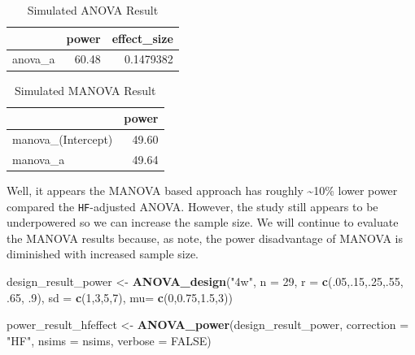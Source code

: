 \documentclass[
]{book}
\newenvironment{Shaded}{\begin{snugshade}}{\end{snugshade}}
\newcommand{\DataTypeTok}[1]{\textcolor[rgb]{0.13,0.29,0.53}{#1}}
\newcommand{\DecValTok}[1]{\textcolor[rgb]{0.00,0.00,0.81}{#1}}
\newcommand{\FloatTok}[1]{\textcolor[rgb]{0.00,0.00,0.81}{#1}}
\newcommand{\KeywordTok}[1]{\textcolor[rgb]{0.13,0.29,0.53}{\textbf{#1}}}
\newcommand{\NormalTok}[1]{#1}
\newcommand{\OtherTok}[1]{\textcolor[rgb]{0.56,0.35,0.01}{#1}}
\newcommand{\StringTok}[1]{\textcolor[rgb]{0.31,0.60,0.02}{#1}}
\begin{document}
\begin{table}[!h]

\caption{\label{tab:unnamed-chunk-141}Simulated ANOVA Result}
\centering
\begin{tabular}[t]{l|r|r}
\hline
  & power & effect\_size\\
\hline
anova\_a & 60.48 & 0.1479382\\
\hline
\end{tabular}
\end{table}
\begin{table}[!h]

\caption{\label{tab:unnamed-chunk-142}Simulated MANOVA Result}
\centering
\begin{tabular}[t]{l|r}
\hline
  & power\\
\hline
manova\_(Intercept) & 49.60\\
\hline
manova\_a & 49.64\\
\hline
\end{tabular}
\end{table}

\newpage

Well, it appears the MANOVA based approach has roughly \textasciitilde{}10\% lower power compared the \texttt{HF}-adjusted ANOVA. However, the study still appears to be underpowered so we can increase the sample size. We will continue to evaluate the MANOVA results because, as \citet{algina1997detecting} note, the power disadvantage of MANOVA is diminished with increased sample size.

\begin{Shaded}
\begin{Highlighting}[]
\NormalTok{design_result_power <-}\StringTok{ }\KeywordTok{ANOVA_design}\NormalTok{(}\StringTok{"4w"}\NormalTok{,}
                              \DataTypeTok{n =} \DecValTok{29}\NormalTok{,}
                              \DataTypeTok{r =} \KeywordTok{c}\NormalTok{(.}\DecValTok{05}\NormalTok{,.}\DecValTok{15}\NormalTok{,.}\DecValTok{25}\NormalTok{,.}\DecValTok{55}\NormalTok{, }\FloatTok{.65}\NormalTok{, }\FloatTok{.9}\NormalTok{),}
                              \DataTypeTok{sd =} \KeywordTok{c}\NormalTok{(}\DecValTok{1}\NormalTok{,}\DecValTok{3}\NormalTok{,}\DecValTok{5}\NormalTok{,}\DecValTok{7}\NormalTok{),}
                              \DataTypeTok{mu=} \KeywordTok{c}\NormalTok{(}\DecValTok{0}\NormalTok{,}\FloatTok{0.75}\NormalTok{,}\FloatTok{1.5}\NormalTok{,}\DecValTok{3}\NormalTok{))}

\NormalTok{power_result_hfeffect <-}\StringTok{ }\KeywordTok{ANOVA_power}\NormalTok{(design_result_power, }
                                     \DataTypeTok{correction =} \StringTok{"HF"}\NormalTok{,}
                                     \DataTypeTok{nsims =}\NormalTok{ nsims, }
                                     \DataTypeTok{verbose =} \OtherTok{FALSE}\NormalTok{)}
\end{Highlighting}
\end{Shaded}
\end{document}
